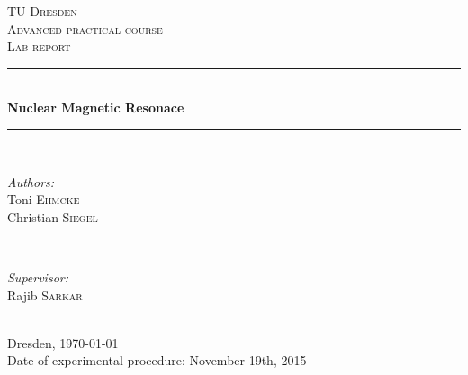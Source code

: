 \begin{titlepage}
\newcommand{\HRule}{\rule{\linewidth}{0.5mm}} %

\center %
 

\textsc{\LARGE TU Dresden}\\[1.5cm] %
\textsc{\Large Advanced practical course}\\[0.5cm] %
\textsc{\Large Lab report}\\[0.5cm] %


\HRule \\[0.7cm]
{ \huge \bfseries Nuclear Magnetic Resonace}\\[0.4cm] %
\HRule \\[1.5cm]
 

\begin{minipage}{0.4\textwidth}
\begin{flushleft} \large
\emph{Authors:}\\
Toni \textsc{Ehmcke}\\
Christian \textsc{Siegel}
\end{flushleft}
\end{minipage}
~
\begin{minipage}{0.4\textwidth}
\begin{flushright} \large
\emph{Supervisor:} \\
Rajib \textsc{Sarkar} %
\end{flushright}
\end{minipage}\\[4cm]


{\large Dresden, \today}\\ %
{\large Date of experimental procedure: November 19th, 2015}\\[3cm]


\vfill 

\end{titlepage}